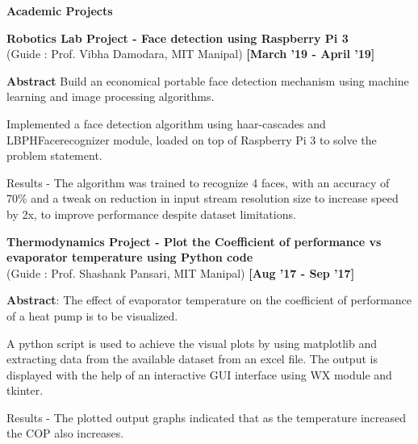\documentclass[a4paper,10pt]{article}
\begin{document}
\colorbox{titleColor}{\parbox{6.7in}{\textbf{Academic Projects}}}

\begin{itemize*}
  \setlength{\itemsep}{1pt}
  \item \textbf{Robotics Lab Project - Face detection using Raspberry Pi 3} \\
{(Guide : Prof. Vibha Damodara, MIT Manipal)}  
\hfill {\small{{\textbf{[March '19 - April '19]}}\/}}
\begin{itemize*}

  \setlength{\itemsep}{.00pt}
      \item \textbf{Abstract} Build an economical portable face detection mechanism using machine learning and image processing algorithms.
      \item Implemented a face detection algorithm using haar-cascades and LBPHFacerecognizer module, loaded on top of Raspberry Pi 3 to solve the problem statement.
	  \item Results - The algorithm was trained to recognize 4 faces, with an accuracy of 70\% and a tweak on reduction in input stream resolution size to increase speed by 2x, to improve performance despite dataset limitations.
\end{itemize*}
\end{itemize*}



\begin{itemize*}
  \setlength{\itemsep}{1pt}
  \item \textbf{Thermodynamics Project - Plot the Coefficient of performance vs evaporator temperature using Python code
}  \\
{(Guide : Prof. Shashank Pansari, MIT Manipal)} \hfill {\small{{\textbf{[Aug '17 - Sep '17]}}\/}}
\begin{itemize*}
  \setlength{\itemsep}{.00pt}
      \item \textbf{Abstract}: The effect of evaporator temperature on the coefficient of performance of a heat pump is to be visualized.
      \item  A python script is used to achieve the visual plots by using matplotlib and extracting data from the available dataset from an excel file.
The output is displayed with the help of an interactive GUI interface using WX module
and tkinter.
	  \item Results - The plotted output graphs indicated that as the temperature increased the COP also increases.
  
\end{itemize*}
\end{itemize*}
\end{document}
